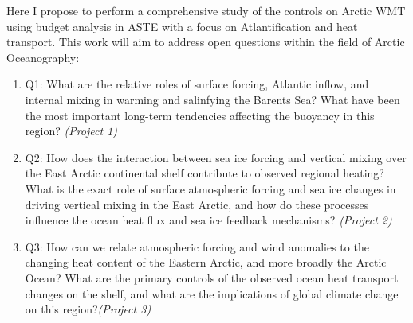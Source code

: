 \documentclass[a4paper,12pt]{article}
\begin{document}
    Here I propose to perform a comprehensive study of the controls on Arctic WMT using budget analysis in ASTE with a focus on Atlantification and heat transport. This work will aim to address open questions within the field of Arctic Oceanography:

    \begin{enumerate}
        \item Q1: What are the relative roles of surface forcing, Atlantic inflow, and internal mixing in warming and salinfying the Barents Sea? What have been the most important long-term tendencies affecting the buoyancy in this region? \emph{(Project 1)}
        \item Q2: How does the interaction between sea ice forcing and vertical mixing over the East Arctic continental shelf contribute to observed regional heating? What is the exact role of surface atmospheric forcing and sea ice changes in driving vertical mixing in the East Arctic, and how do these processes influence the ocean heat flux and sea ice feedback mechanisms? \emph{(Project 2)}
        \item Q3: How can we relate atmospheric forcing and wind anomalies to the changing heat content of the Eastern Arctic, and more broadly the Arctic Ocean? What are the primary controls of the observed ocean heat transport changes on the shelf, and what are the implications of global climate change on this region?\emph{(Project 3)}
    \end{enumerate}


\end{document}
